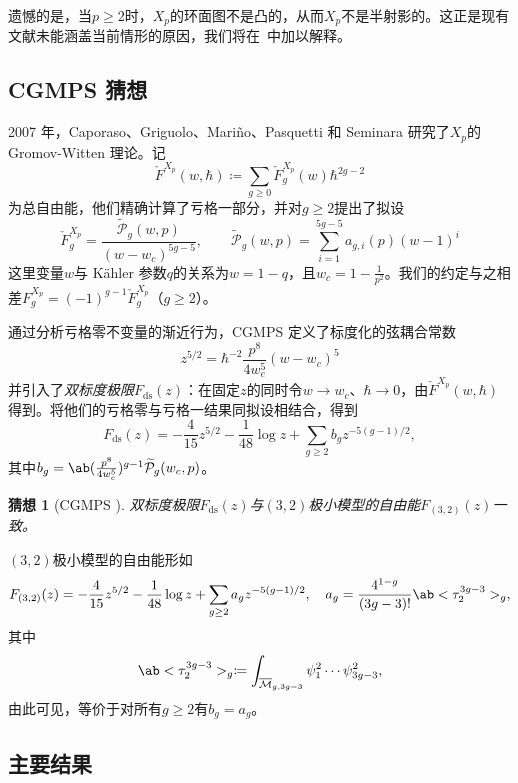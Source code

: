 \documentclass{amsart}
\newtheorem{conj}[thm]{猜想}
\theoremstyle{definition}
\theoremstyle{remark}
\theoremstyle{plain}
\theoremstyle{definition}
\theoremstyle{remark}
\newcommand{\Mbar}{\overline{\mathcal{M}}}
\newcommand{\mc}[1]{\mathcal{#1}}
\newcommand{\mr}[1]{\mathrm{#1}}
\newcommand{\wt}[1]{\widetilde{#1}}
\newcommand{\1}{\mathbf{1}}
\newcommand{\2}{\mathbf{2}}
\newcommand{\3}{\mathbf{3}}
\begin{document}
遗憾的是，当\(p \geq 2\)时，\(X_p\)的环面图不是凸的，从而\(X_p\)不是半射影的。这正是现有文献未能涵盖当前情形的原因，我们将在~中加以解释。

\subsection{CGMPS 猜想}%
\label{sub:The conjecture of CGMPS}

2007 年，Caporaso、Griguolo、Mari\~{n}o、Pasquetti 和 Seminara 研究了\(X_p\)的 Gromov-Witten 理论。记
\[ \check{F}^{X_p}(w,\hbar) \coloneqq \sum_{g \geq 0} \check{F}_g^{X_p}(w) \hbar^{2g-2} \]
为总自由能，他们精确计算了亏格一部分，并对\(g \geq 2\)提出了拟设
\begin{equation}\label{eqn:cgmps ansatz}
    \check{F}_g^{X_p} = \frac{\wt{\mc{P}}_g(w,p)}{(w-w_c)^{5g-5}}, \qquad \wt{\mc{P}}_g(w,p) = \sum_{i=1}^{5g-5} a_{g,i}(p)(w-1)^i
\end{equation}
这里变量\(w\)与 Kähler 参数\(q\)的关系为\(w = 1-q\)，且\(w_c = 1 - \frac{1}{p^2}\)。我们的约定与之相差\(F_g^{X_p} = (-1)^{g-1}\check{F}_g^{X_p}\)（\(g \geq 2\)）。

通过分析亏格零不变量的渐近行为，CGMPS 定义了标度化的弦耦合常数
\[ z^{5/2} = \hbar^{-2} \frac{p^8}{4w_c^5}(w-w_c)^5 \]
并引入了\textit{双标度极限}\(F_{\mr{ds}}(z)\)：在固定\(z\)的同时令\(w \to w_c\)、\(\hbar \to 0\)，由\(\check{F}^{X_p}(w,\hbar)\)得到。将他们的亏格零与亏格一结果同拟设相结合，得到
\[ F_{\mr{ds}}(z) = -\frac{4}{15}z^{5/2} - \frac{1}{48}\log z + \sum_{g \geq 2} b_g z^{-5(g-1)/2}, \]
其中\(b_g = \ab(\frac{p^8}{4w_c^5})^{g-1}\wt{\mc{P}}_g(w_c,p)\)。

\begin{conj}[CGMPS {\cite{CGMPS2007}}]%
\label{conj:cgmps}
    双标度极限\(F_{\mr{ds}}(z)\)与\((3,2)\)极小模型的自由能\(F_{(3,2)}(z)\)一致。
\end{conj}

\((3,2)\)极小模型的自由能形如
\[ F_{(3,2)}(z) = -\frac{4}{15}z^{5/2} - \frac{1}{48}\log z + \sum_{g\geq2} a_g z^{-5(g-1)/2}, \quad a_g = \frac{4^{1-g}}{(3g-3)!}\ab<\tau_2^{3g-3}>_g, \]
其中
\[ \ab<\tau_2^{3g-3}>_g \coloneqq \int_{\Mbar_{g,3g-3}} \psi_1^2 \cdots \psi_{3g-3}^2, \]
由此可见，等价于对所有\(g \geq 2\)有\(b_g = a_g\)。

\subsection{主要结果}%
\label{sub:The main results (Guo local P1)}
\end{document}
